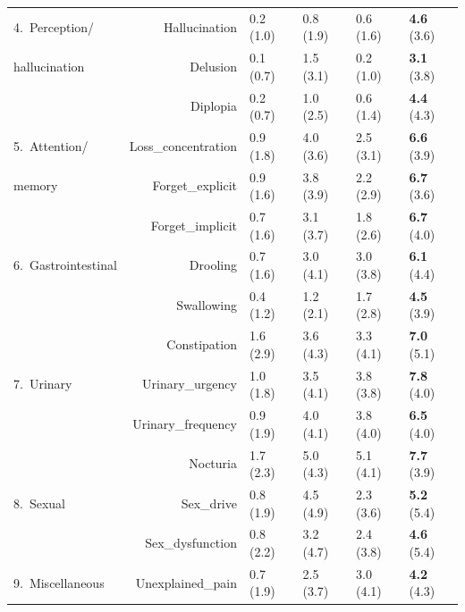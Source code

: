 \documentclass[preprint,3p,twocolumn]{elsarticle} %
\begin{document}
\begin{table}[t]
\begin{threeparttable}
\begin{tabular}{lrllll}
  \midrule
  4.\ Perception/ & Hallucination & 0.2 (1.0)\tnote{234} & 0.8 (1.9)\tnote{14} & 0.6 (1.6)\tnote{14} & \textbf{4.6} (3.6)\tnote{123} \\
  hallucination &Delusion & 0.1 (0.7)\tnote{24} & 1.5 (3.1)\tnote{124} & 0.2 (1.0)\tnote{24} &
  \textbf{3.1} (3.8)\tnote{123} \\
  &Diplopia & 0.2 (0.7)\tnote{234} & 1.0 (2.5)\tnote{14} & 0.6 (1.4)\tnote{14} & \textbf{4.4}
  (4.3)\tnote{123} \\
  \midrule
  5.\ Attention/ & Loss\_concentration & 0.9 (1.8)\tnote{234} & 4.0 (3.6)\tnote{134} & 2.5 (3.1)\tnote{124} & \textbf{6.6} (3.9)\tnote{123} \\
  memory &Forget\_explicit & 0.9 (1.6)\tnote{234} & 3.8 (3.9)\tnote{134} & 2.2 (2.9)\tnote{124} & \textbf{6.7} (3.6)\tnote{123} \\
  &Forget\_implicit & 0.7 (1.6)\tnote{234} & 3.1 (3.7)\tnote{134} & 1.8 (2.6)\tnote{124} & \textbf{6.7} (4.0)\tnote{123} \\
  \midrule
  6.\ Gastrointestinal &
  Drooling & 0.7 (1.6)\tnote{234} & 3.0 (4.1)\tnote{14} & 3.0 (3.8)\tnote{14} & \textbf{6.1} (4.4)\tnote{123} \\
  &Swallowing & 0.4 (1.2)\tnote{234} & 1.2 (2.1)\tnote{14} & 1.7 (2.8)\tnote{14} & \textbf{4.5} (3.9)\tnote{123} \\
  &Constipation & 1.6 (2.9)\tnote{234} & 3.6 (4.3)\tnote{14} & 3.3 (4.1)\tnote{14} & \textbf{7.0} (5.1)\tnote{123} \\
  \midrule
  7.\ Urinary &
  Urinary\_urgency & 1.0 (1.8)\tnote{234} & 3.5 (4.1)\tnote{14} & 3.8 (3.8)\tnote{14} & \textbf{7.8} (4.0)\tnote{123} \\
  &Urinary\_frequency & 0.9 (1.9)\tnote{234} & 4.0 (4.1)\tnote{14} & 3.8 (4.0)\tnote{14} & \textbf{6.5} (4.0)\tnote{123} \\
  &Nocturia & 1.7 (2.3)\tnote{234} & 5.0 (4.3)\tnote{14} & 5.1 (4.1)\tnote{14} & \textbf{7.7} (3.9)\tnote{123} \\
  \midrule
  8.\ Sexual &
  Sex\_drive & 0.8 (1.9)\tnote{234} & 4.5 (4.9)\tnote{13} & 2.3 (3.6)\tnote{124} & \textbf{5.2} (5.4)\tnote{13} \\
  &Sex\_dysfunction & 0.8 (2.2)\tnote{234} & 3.2 (4.7)\tnote{1} & 2.4 (3.8)\tnote{14} &
  \textbf{4.6} (5.4)\tnote{13} \\
  \midrule
  9.\ Miscellaneous &
  Unexplained\_pain & 0.7 (1.9)\tnote{234} & 2.5 (3.7)\tnote{14} & 3.0 (4.1)\tnote{14} & \textbf{4.2} (4.3)\tnote{123} \\

\end{tabular}
\end{threeparttable}
\end{table}
\end{document}
